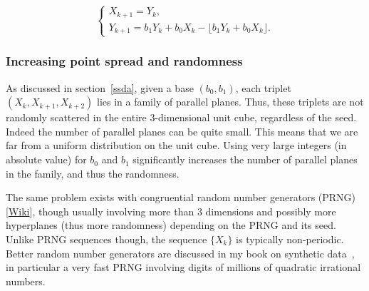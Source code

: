 \documentclass[oneside,10pt]{book}
\begin{document}
\begin{equation}
    \begin{cases}
      X_{k+1} = Y_k, \nonumber\\[3pt]
     Y_{k+1} = b_1Y_k + b_0X_k - \lfloor b_1Y_k + b_0X_k \rfloor.\nonumber
    \end{cases} %
\end{equation}

\subsubsection{Increasing point spread and randomness}\label{oidfjb6}

As discussed in section~\ref{ssda}, given a base $(b_0, b_1)$, each triplet $(X_k,X_{k+1},X_{k+2})$ lies in a family of parallel planes. Thus, these triplets are not randomly scattered in the entire 3-dimensional unit cube, regardless of the seed. Indeed the number of parallel planes can be quite small. This means that we are far from a uniform distribution on the unit cube. Using very large integers (in absolute value)  for $b_0$ and $b_1$ significantly increases the number of parallel planes in the family, and thus the randomness.

The same problem exists
 with
\textcolor{index}{congruential random number generators} (PRNG) [\href{https://en.wikipedia.org/wiki/Linear_congruential_generator}{Wiki}], though usually involving more than 3 dimensions and possibly more hyperplanes (thus more randomness) depending on the PRNG and its seed.  Unlike PRNG sequences though, the sequence $\{X_k\}$ is typically non-periodic. Better random number generators are discussed in my book on synthetic data~\cite{vgsynthetic}, in particular a very fast PRNG involving digits of millions of quadratic irrational numbers.
\end{document}
